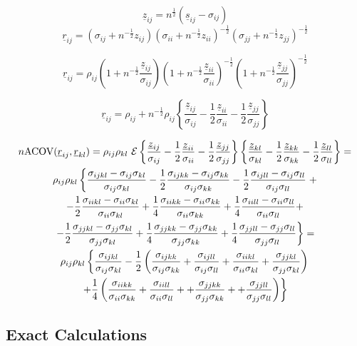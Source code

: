 \documentclass[
  12pt,
  letterpaper,
  DIV=11,
  numbers=noendperiod]{scrartcl}
\newcommand{\ul}[1]{\underline{#1}}
\begin{document}
\[
\ul{z}_{ij}=n^\frac12(\ul{s}_{ij}-\sigma_{ij})
\] \[
\ul{r}_{ij}=(\sigma_{ij}+n^{-\frac12}z_{ij})(\sigma_{ii}+n^{-\frac12}z_{ii})^{-\frac12}(\sigma_{jj}+n^{-\frac12}z_{jj})^{-\frac12}
\]

\[
\ul{r}_{ij}=\rho_{ij}(1+n^{-\frac12}\frac{\ul{z}_{ij}}{\sigma_{ij}})(1+n^{-\frac12}\frac{\ul{z}_{ii}}{\sigma_{ii}})^{-\frac12}(1+n^{-\frac12}\frac{\ul{z}_{jj}}{\sigma_{jj}})^{-\frac12}
\]

\[
\ul{r}_{ij}=\rho_{ij}+n^{-\frac12}\rho_{ij}\left\{\frac{\ul{z}_{ij}}{\sigma_{ij}}-\frac12\frac{\ul{z}_{ii}}{\sigma_{ii}}-\frac12\frac{\ul{z}_{jj}}{\sigma_{jj}}\right\}
\]

\begin{multline}
n\text{ACOV}(\ul{r}_{ij},\ul{r}_{kl})=\rho_{ij}\rho_{kl}\ \large{\mathcal{E}}\left\{\frac{\ul{z}_{ij}}{\sigma_{ij}}-\frac12\frac{\ul{z}_{ii}}{\sigma_{ii}}-\frac12\frac{\ul{z}_{jj}}{\sigma_{jj}}\right\}\left\{\frac{\ul{z}_{kl}}{\sigma_{kl}}-\frac12\frac{\ul{z}_{kk}}{\sigma_{kk}}-\frac12\frac{\ul{z}_{ll}}{\sigma_{ll}}\right\}=\\
\rho_{ij}\rho_{kl}\left\{\frac{\sigma_{ijkl}-\sigma_{ij}\sigma_{kl}}{\sigma_{ij}\sigma_{kl}}-\frac12\frac{\sigma_{ijkk}-\sigma_{ij}\sigma_{kk}}{\sigma_{ij}\sigma_{kk}}-\frac12\frac{\sigma_{ijll}-\sigma_{ij}\sigma_{ll}}{\sigma_{ij}\sigma_{ll}}\right.+\\
-\frac12\frac{\sigma_{iikl}-\sigma_{ii}\sigma_{kl}}{\sigma_{ii}\sigma_{kl}}+\frac14\frac{\sigma_{iikk}-\sigma_{ii}\sigma_{kk}}{\sigma_{ii}\sigma_{kk}}+\frac14\frac{\sigma_{iill}-\sigma_{ii}\sigma_{ll}}{\sigma_{ii}\sigma_{ll}}+\\
\left.-\frac12\frac{\sigma_{jjkl}-\sigma_{jj}\sigma_{kl}}{\sigma_{jj}\sigma_{kl}}+\frac14\frac{\sigma_{jjkk}-\sigma_{jj}\sigma_{kk}}{\sigma_{jj}\sigma_{kk}}+\frac14\frac{\sigma_{jjll}-\sigma_{jj}\sigma_{ll}}{\sigma_{jj}\sigma_{ll}}\right\}=\\
\rho_{ij}\rho_{kl}\left\{\frac{\sigma_{ijkl}}{\sigma_{ij}\sigma_{kl}}
-\frac12\left(\frac{\sigma_{ijkk}}{\sigma_{ij}\sigma_{kk}}
+\frac{\sigma_{ijll}}{\sigma_{ij}\sigma_{ll}}
+\frac{\sigma_{iikl}}{\sigma_{ii}\sigma_{kl}}
+\frac{\sigma_{jjkl}}{\sigma_{jj}\sigma_{kl}}\right)\right.\\
\left.+\frac14\left(\frac{\sigma_{iikk}}{\sigma_{ii}\sigma_{kk}}
+\frac{\sigma_{iill}}{\sigma_{ii}\sigma_{ll}}+
+\frac{\sigma_{jjkk}}{\sigma_{jj}\sigma_{kk}}+
+\frac{\sigma_{jjll}}{\sigma_{jj}\sigma_{ll}}\right)\right\}
\end{multline}

\subsection{Exact Calculations}\label{exact-calculations}
\end{document}
